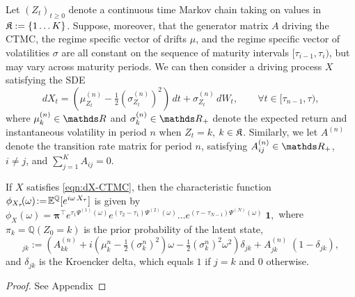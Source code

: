 \documentclass[onefignum,onetabnum]{siamonline190516}
\begin{document}
Let $(Z_t)_{t\ge0}$ denote a continuous time Markov chain taking on values in ${\mathfrak{K}}:=\{1 \dots K\}$.  Suppose, moreover, that the generator matrix $A$ driving the CTMC, the regime specific vector of drifts $\mu$, and the regime specific vector of volatilities $\sigma$ are all constant on the sequence of maturity intervals $[\tau_{i-1},\tau_{i})$, but may vary across maturity periods. We can then consider a driving process $X$ satisfying the SDE
\begin{equation}
    dX_t = \left( \mu^{(n)}_{Z_t} - \tfrac{1}{2} (\sigma^{(n)}_{Z_t})^2 \right) \, dt
    + \sigma^{(n)}_{Z_t}\, dW_t, \qquad \forall t\in[\tau_{n-1},\tau),
    \label{eqn:dX-CTMC}
\end{equation}
where $\mu_{k}^{(n)}\in\R$ and $\sigma_k^{(n)}\in\R_+$ denote the expected return and instantaneous volatility in period $n$ when $Z_t=k$, $k\in{\mathfrak{K}}$. Similarly, we let $A^{(n)}$  denote the transition rate matrix for period $n$, satisfying $A^{(n)}_{ij}\in\R_+$, $i\ne j$, and $\sum_{j=1}^KA_{ij}=0$.
\begin{proposition}
\label{prop:ctmc}
   \!\!If $X$ satisfies \eqref{eqn:dX-CTMC}, then the characteristic function $\phi_{X_{\tau}}\!(\omega)\!:=\!{{\mathbb{E}}^{\mathbb{Q}}}[e^{i\omega\,X_{\tau}}]$ is given by
    $\phi_{X}(\omega) = {\boldsymbol{\pi}}^\intercal e^{\tau_1 \Psi^{(1)}(\omega)} e^{(\tau_{2} - \tau_{1}) \Psi^{(2)}(\omega)} \dots e^{(\tau - \tau_{N-1}) \Psi^{(N)}(\omega)}\; \boldsymbol{1},
    $
    where $\pi_k=\mathbb{Q}(Z_0=k)$ is the prior probability of the latent state,
    \begin{equation}
    [\Psi^{(n)}(\omega)]_{jk} := \left( A^{(n)}_{kk} + i \left(\mu_k^n - \tfrac{1}{2} (\sigma_k^n)^2\right) \omega - \tfrac{1}{2} (\sigma_k^n)^2 \omega^2 \right) \delta_{jk} + A^{(n)}_{jk} \;(1 - \delta_{jk}),
\end{equation}
and $\delta_{jk}$ is the Kroencker delta, which equals $1$ if $j = k$ and $0$ otherwise.
\end{proposition}
\begin{proof}
    See Appendix
\end{proof}



\end{document}
